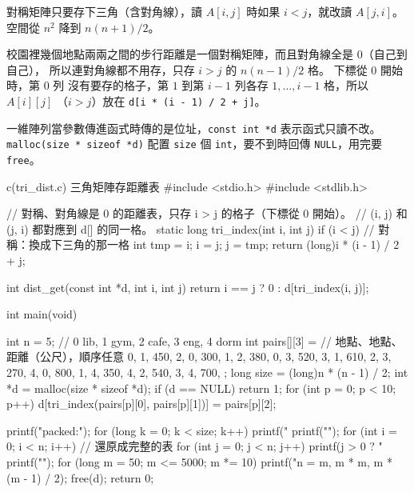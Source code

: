 對稱矩陣只要存下三角（含對角線），讀 $A[i, j]$ 時如果 $i < j$，就改讀 $A[j, i]$。
空間從 $n^2$ 降到 $n(n + 1)/2$。

校園裡幾個地點兩兩之間的步行距離是一個對稱矩陣，而且對角線全是 $0$（自己到自己），
所以連對角線都不用存，只存 $i > j$ 的 $n(n - 1)/2$ 格。 下標從 $0$ 開始時，第 $0$ 列
沒有要存的格子，第 $1$ 到第 $i - 1$ 列各存 $1, \ldots, i - 1$ 格，所以 $A[i][j]$
（$i > j$）放在 \texttt{d[i * (i - 1) / 2 + j]}。

\begin{cbookrecap}[第~8~章 8.6 節、第~9~章 9.3 節、第~19~章 19.3 節]
一維陣列當參數傳進函式時傳的是位址，\texttt{const int *d} 表示函式只讀不改。
\texttt{malloc(size * sizeof *d)} 配置 \texttt{size} 個 \texttt{int}，要不到時回傳
\texttt{NULL}，用完要 \texttt{free}。
\end{cbookrecap}

\begin{example}[label=ex:arr-tri-dist]{c}{(tri\_dist.c) 三角矩陣存距離表}
#include <stdio.h>
#include <stdlib.h>

// 對稱、對角線是 0 的距離表，只存 i > j 的格子（下標從 0 開始）。
// (i, j) 和 (j, i) 都對應到 d[] 的同一格。
static long tri_index(int i, int j)
{
    if (i < j) {                // 對稱：換成下三角的那一格
        int tmp = i; i = j; j = tmp;
    }
    return (long)i * (i - 1) / 2 + j;
}

int dist_get(const int *d, int i, int j)
{
    return i == j ? 0 : d[tri_index(i, j)];
}

int main(void)
{
    int n = 5;                  // 0 lib, 1 gym, 2 cafe, 3 eng, 4 dorm
    int pairs[][3] = {          // 地點、地點、距離（公尺），順序任意
        {0, 1, 450}, {2, 0, 300}, {1, 2, 380}, {0, 3, 520},
        {3, 1, 610}, {2, 3, 270}, {4, 0, 800}, {1, 4, 350},
        {4, 2, 540}, {3, 4, 700},
    };
    long size = (long)n * (n - 1) / 2;
    int *d = malloc(size * sizeof *d);
    if (d == NULL)
        return 1;
    for (int p = 0; p < 10; p++)
        d[tri_index(pairs[p][0], pairs[p][1])] = pairs[p][2];

    printf("packed:");
    for (long k = 0; k < size; k++)
        printf(" %
    printf("\n");
    for (int i = 0; i < n; i++) {         // 還原成完整的表
        for (int j = 0; j < n; j++)
            printf(j > 0 ? " %
        printf("\n");
    }
    for (long m = 50; m <= 5000; m *= 10)
        printf("n = %
               m, m * m, m * (m - 1) / 2);
    free(d);
    return 0;
}
\end{example}

